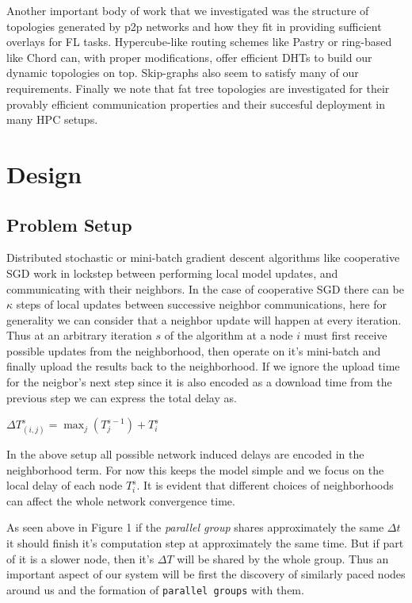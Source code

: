 \documentclass[12pt,notitlepage]{article}
\newcommand{\bmc}{\begin{center} \begin{math}}
\newcommand{\emc}{\end{math} \end{center}}
\begin{document}
Another important body of work that we investigated was the structure of
topologies generated by p2p networks and how they fit in providing sufficient
overlays for FL tasks. Hypercube-like routing schemes like Pastry \cite{pastry}
 or ring-based like Chord \cite{chord} can, with proper modifications, offer
efficient DHTs to build our dynamic topologies on top. Skip-graphs 
\cite{skip-graphs} also seem to satisfy many of our requirements.
Finally we note that fat tree topologies \cite{fat-trees} are investigated 
for their provably efficient communication properties and their succesful 
deployment in many HPC setups.

\section{Design}
\subsection{Problem Setup}
Distributed stochastic or mini-batch gradient descent algorithms like 
cooperative SGD \cite{coop-sgd} work in lockstep between performing local 
model updates, and communicating with their neighbors. In the case of 
cooperative SGD there can be $\kappa$ steps of local updates between successive
neighbor communications, here for generality we can consider that a neighbor
update will happen at every iteration. Thus at an arbitrary iteration $s$ of
the algorithm at a node $i$ must first receive possible updates from the 
neighborhood, then operate on it's mini-batch and finally upload the results
back to the neighborhood. If we ignore the upload time for the neigbor's next 
step since it is also encoded as a download time from the previous step we can
express the total delay as.
\bmc
\Delta T^s_{(i,j)} = \max_j(T_{j}^{s-1}) + T^s_i 
\emc

In the above setup all possible network induced delays are encoded in the 
neighborhood term. For now this keeps the model simple and we focus on the 
local delay of each node $T^s_i$. It is evident that different choices of
neighborhoods can affect the whole network convergence time.                                                                                                                                                                  

As seen above in Figure 1 if the {\it parallel group} shares approximately the
same $\Delta t$ it should finish it's computation step at approximately the 
same time. But if part of it is a slower node, then it's $\Delta T$ will be
shared by the whole group. Thus an important aspect of our system  will be
first the discovery of similarly paced nodes around us and the formation of
{\tt parallel groups} with them. 
\end{document}
